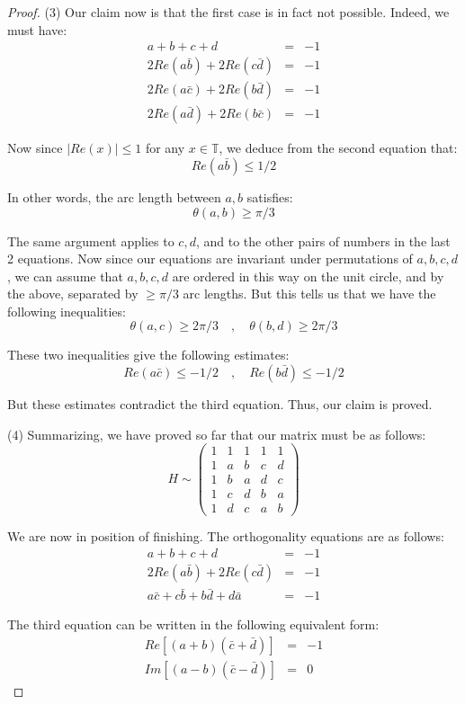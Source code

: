 \documentclass[12pt]{amsbook}
\begin{document}
\begin{proof}
(3) Our claim now is that the first case is in fact not possible. Indeed, we must have:
\begin{eqnarray*}
a+b+c+d&=&-1\\
2Re(a\bar{b})+2Re(c\bar{d})&=&-1\\
2Re(a\bar{c})+2Re(b\bar{d})&=&-1\\
2Re(a\bar{d})+2Re(b\bar{c})&=&-1
\end{eqnarray*}

Now since $|Re(x)|\leq1$ for any $x\in\mathbb T$, we deduce from the second equation that:
$$Re(a\bar{b})\leq 1/2$$

In other words, the arc length between $a,b$ satisfies:
$$\theta(a,b)\geq\pi/3$$

The same argument applies to $c,d$, and to the other pairs of numbers in the last 2 equations. Now since our equations are invariant under permutations of $a,b,c,d$, we can assume that $a,b,c,d$ are ordered in this way on the unit circle, and by the above, separated by $\geq\pi/3$ arc lengths. But this tells us that we have the following inequalities:
$$\theta(a,c)\geq 2\pi/3\quad,\quad 
\theta(b,d)\geq 2\pi/3$$

These two inequalities give the following estimates:
$$Re(a\bar{c})\leq-1/2\quad,\quad 
Re(b\bar{d})\leq-1/2$$

But these estimates contradict the third equation. Thus, our claim is proved.

\medskip

(4) Summarizing, we have proved so far that our matrix must be as follows:
$$H\sim\begin{pmatrix}
1&1&1&1&1\\
1&a&b&c&d\\
1&b&a&d&c\\
1&c&d&b&a\\
1&d&c&a&b
\end{pmatrix}$$

We are now in position of finishing. The orthogonality equations are as follows:
\begin{eqnarray*}
a+b+c+d&=&-1\\
2Re(a\bar{b})+2Re(c\bar{d})&=&-1\\
a\bar{c}+c\bar{b}+b\bar{d}+d\bar{a}&=&-1
\end{eqnarray*}

The third equation can be written in the following equivalent form:
\begin{eqnarray*}
Re[(a+b)(\bar{c}+\bar{d})]&=&-1\\
Im[(a-b)(\bar{c}-\bar{d})]&=&0
\end{eqnarray*}


\end{proof}
\end{document}
